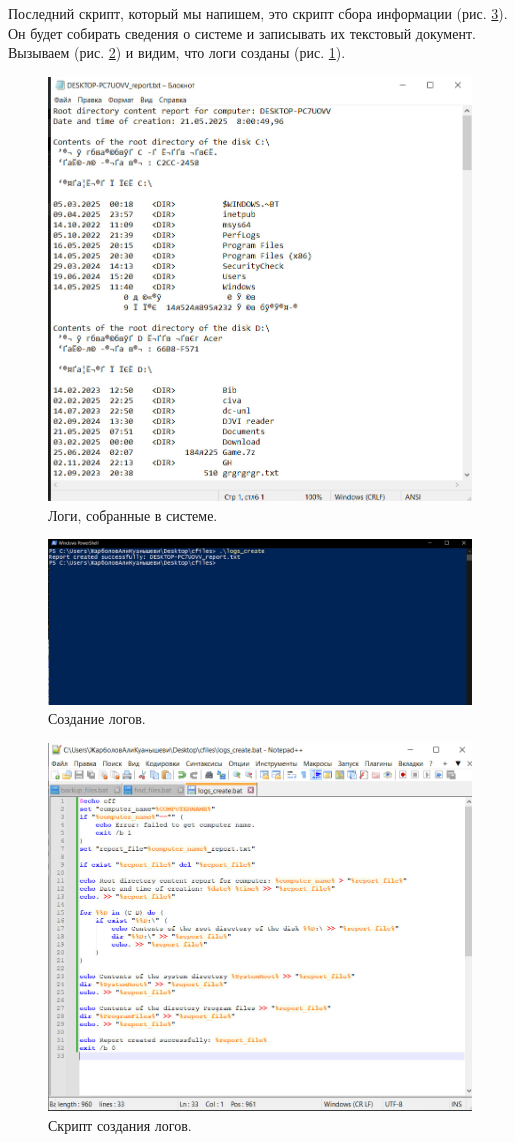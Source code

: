 Последний скрипт, который мы напишем, это скрипт сбора информации (рис. \ref{fig:logsCreate}). Он будет собирать сведения о системе и записывать их текстовый документ. Вызываем (рис. \ref{fig:logsresult}) и видим, что логи созданы (рис. \ref{fig:logstxt}).
\begin{figure}[h!]
    \centering
    \includegraphics[width=0.3\linewidth]{Pic/lab1/photo_2025-05-21_08-15-57.jpg}
    \caption{Логи, собранные в системе.}
    \label{fig:logstxt}
\end{figure}
\begin{figure}[h!]
    \centering
    \includegraphics[width=0.5\linewidth]{Pic/lab1/photo_2025-05-21_08-15-56.jpg}
    \caption{Создание логов.}
    \label{fig:logsresult}
\end{figure}
\begin{figure}[h!]
    \centering
    \includegraphics[width=0.6\linewidth]{Pic/lab1/photo_2025-05-21_08-15-54.jpg}
    \caption{Скрипт создания логов.}
    \label{fig:logsCreate}
\end{figure}
